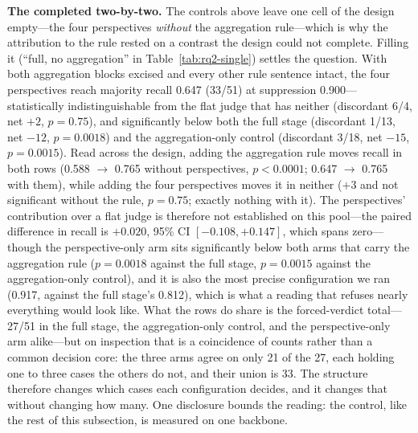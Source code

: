 \documentclass[acmsmall,screen,review,anonymous]{acmart}
\begin{document}
\textbf{The completed two-by-two.} The controls above leave one cell of the design empty---the four perspectives \emph{without} the aggregation rule---which is why the attribution to the rule rested on a contrast the design could not complete. Filling it (``full, no aggregation'' in Table~\ref{tab:rq2-single}) settles the question. With both aggregation blocks excised and every other rule sentence intact, the four perspectives reach majority recall 0.647 (33/51) at suppression 0.900---statistically indistinguishable from the flat judge that has neither (discordant 6/4, net $+2$, $p{=}0.75$), and significantly below both the full stage (discordant 1/13, net $-12$, $p{=}0.0018$) and the aggregation-only control (discordant 3/18, net $-15$, $p{=}0.0015$). Read across the design, adding the aggregation rule moves recall in both rows (0.588 $\to$ 0.765 without perspectives, $p{<}0.0001$; 0.647 $\to$ 0.765 with them), while adding the four perspectives moves it in neither ($+3$ and not significant without the rule, $p{=}0.75$; exactly nothing with it). The perspectives' contribution over a flat judge is therefore not established on this pool---the paired difference in recall is $+0.020$, 95\% CI $[-0.108, +0.147]$, which spans zero---though the perspective-only arm sits significantly below both arms that carry the aggregation rule ($p{=}0.0018$ against the full stage, $p{=}0.0015$ against the aggregation-only control), and it is also the most precise configuration we ran (0.917, against the full stage's 0.812), which is what a reading that refuses nearly everything would look like. What the rows do share is the forced-verdict total---27/51 in the full stage, the aggregation-only control, and the perspective-only arm alike---but on inspection that is a coincidence of counts rather than a common decision core: the three arms agree on only 21 of the 27, each holding one to three cases the others do not, and their union is 33. The structure therefore changes which cases each configuration decides, and it changes that without changing how many. One disclosure bounds the reading: the control, like the rest of this subsection, is measured on one backbone.
\end{document}
